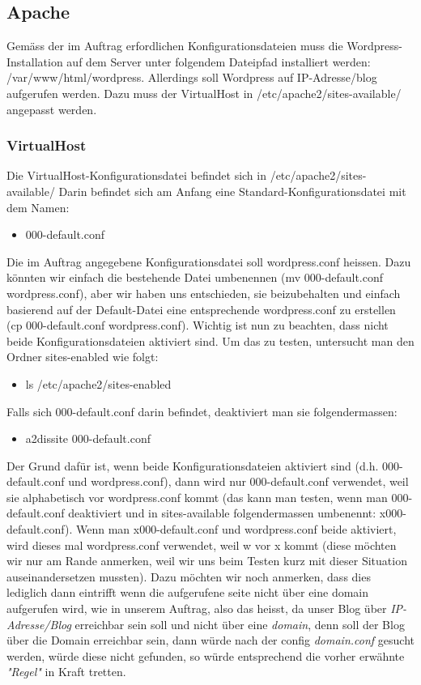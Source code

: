 \documentclass{article}
\begin{document}
	\subsection{Apache}
	Gemäss der im Auftrag erfordlichen Konfigurationsdateien muss die Wordpress-Installation auf dem Server unter folgendem Dateipfad installiert werden: /var/www/html/wordpress.
	Allerdings soll Wordpress auf IP-Adresse/blog aufgerufen werden. Dazu muss der VirtualHost in /etc/apache2/sites-available/ angepasst werden.
	\subsubsection{VirtualHost}
	Die VirtualHost-Konfigurationsdatei befindet sich in /etc/apache2/sites-available/
	Darin befindet sich am Anfang eine Standard-Konfigurationsdatei mit dem Namen:
	\begin{itemize}
		\item 000-default.conf
	\end{itemize}		
	Die im Auftrag angegebene Konfigurationsdatei soll wordpress.conf heissen. Dazu könnten wir einfach die bestehende Datei umbenennen (mv 000-default.conf wordpress.conf), aber wir haben uns entschieden, sie beizubehalten und einfach basierend auf der Default-Datei eine entsprechende wordpress.conf zu erstellen (cp 000-default.conf wordpress.conf). Wichtig ist nun zu beachten, dass nicht beide Konfigurationsdateien aktiviert sind. Um das zu testen, untersucht man den Ordner sites-enabled wie folgt:
	\begin{itemize}
		\item ls /etc/apache2/sites-enabled
	\end{itemize}
	Falls sich  000-default.conf darin befindet, deaktiviert man sie folgendermassen:
	\begin{itemize}
		\item a2dissite  000-default.conf
	\end{itemize}
	Der Grund dafür ist, wenn beide Konfigurationsdateien aktiviert sind (d.h. 000-default.conf und wordpress.conf), dann wird nur 000-default.conf verwendet, weil sie alphabetisch vor wordpress.conf kommt (das kann man testen, wenn man 000-default.conf deaktiviert und in sites-available folgendermassen umbenennt: x000-default.conf). Wenn man x000-default.conf und wordpress.conf beide aktiviert, wird dieses mal wordpress.conf verwendet, weil w vor x kommt (diese möchten wir nur am Rande anmerken, weil wir uns beim Testen kurz mit dieser Situation auseinandersetzen mussten). Dazu möchten wir noch anmerken, dass dies lediglich dann eintrifft wenn die aufgerufene seite nicht über eine domain aufgerufen wird, wie in unserem Auftrag, also das heisst, da unser Blog über \textit{IP-Adresse/Blog} erreichbar sein soll und nicht über eine \textit{domain}, denn soll der Blog über die Domain erreichbar sein, dann würde nach der config \textit{domain.conf} gesucht werden, würde diese nicht gefunden, so würde entsprechend die vorher erwähnte \textit{"Regel"} in Kraft tretten.
\end{document}
